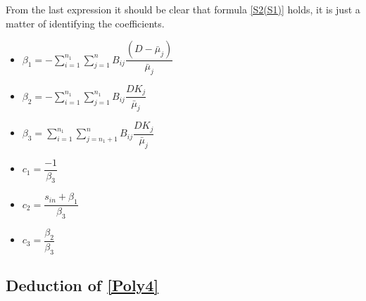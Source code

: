 \documentclass[3p,times]{article}
\begin{document}
From the last expression it should be clear that formula \eqref{S2(S1)} holds, it is just a matter of identifying the coefficients.
\begin{itemize}
	\item $\beta_1 =  - \sum \limits_{i=1}^{n_1} \sum \limits_{j = 1}^{n} B_{ij}\dfrac{(D-\bar{\mu}_j)}{\bar{\mu}_{j}}$
	\item $\beta_2 =-\sum \limits_{i=1}^{n_1}  \sum \limits_{j = 1}^{n_1} B_{ij}\dfrac{DK_j}{\bar{\mu}_{j}}$
	\item $\beta_3 = \sum \limits_{i=1}^{n_1}\sum \limits_{j = n_1+1}^{n} B_{ij}\dfrac{DK_j}{\bar{\mu}_{j}} $
	\item $c_1 = \dfrac{-1}{\beta_3}$
	\item $c_2 =  \dfrac{s_{in} + \beta_1}{\beta_3}$
	\item $c_3 = \dfrac{\beta_2}{\beta_3}$
\end{itemize}

\subsection{Deduction of \eqref{Poly4}}
\end{document}
